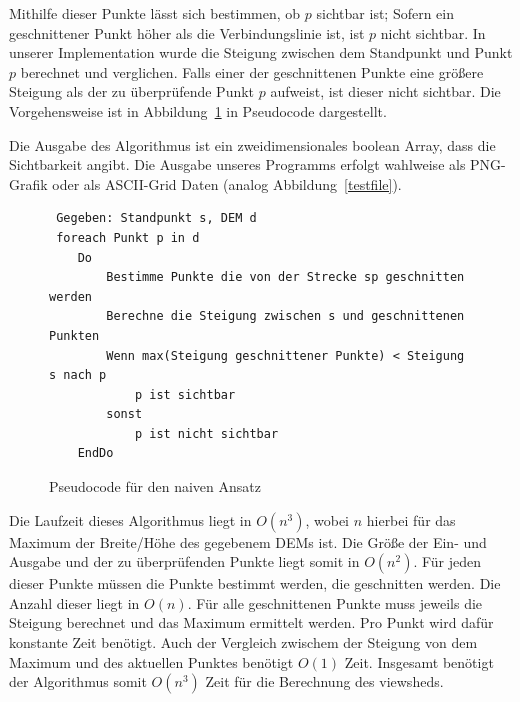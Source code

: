 Mithilfe dieser Punkte lässt sich bestimmen, ob $p$ sichtbar ist; Sofern ein geschnittener Punkt höher als die Verbindungslinie ist, ist $p$ nicht sichtbar. In unserer Implementation wurde die Steigung zwischen dem Standpunkt und Punkt $p$ berechnet und verglichen. Falls einer der geschnittenen Punkte eine größere Steigung als der zu überprüfende Punkt $p$ aufweist, ist dieser nicht sichtbar. Die Vorgehensweise ist in Abbildung~\ref{pseudo:naiv} in Pseudocode dargestellt. 

Die Ausgabe des Algorithmus ist ein zweidimensionales boolean Array, dass die Sichtbarkeit angibt. Die Ausgabe unseres Programms erfolgt wahlweise als PNG-Grafik oder als ASCII-Grid Daten (analog Abbildung~\ref{testfile}).



\begin{figure}[!ht]
 \centering
 \begin{BVerbatim}
 Gegeben: Standpunkt s, DEM d
 foreach Punkt p in d
    Do 
        Bestimme Punkte die von der Strecke sp geschnitten werden 
        Berechne die Steigung zwischen s und geschnittenen Punkten
        Wenn max(Steigung geschnittener Punkte) < Steigung s nach p
            p ist sichtbar
        sonst
            p ist nicht sichtbar
    EndDo
\end{BVerbatim}
\caption{Pseudocode für den naiven Ansatz}
\label{pseudo:naiv}
\end{figure}

Die Laufzeit dieses Algorithmus liegt in $O(n^3)$, wobei $n$ hierbei für das Maximum der Breite/Höhe des gegebenem DEMs ist. 
Die Größe der Ein- und Ausgabe und der zu überprüfenden Punkte liegt somit in $O(n^2)$. 
Für jeden dieser Punkte müssen die Punkte bestimmt werden, die geschnitten werden. Die Anzahl dieser liegt in $O(n)$. 
Für alle geschnittenen Punkte muss jeweils die Steigung berechnet und das Maximum ermittelt werden. Pro Punkt wird dafür konstante Zeit benötigt. 
Auch der Vergleich zwischem der Steigung von dem Maximum und des aktuellen Punktes benötigt $O(1)$ Zeit. 
Insgesamt benötigt der Algorithmus somit $O(n^3)$ Zeit für die Berechnung des viewsheds.